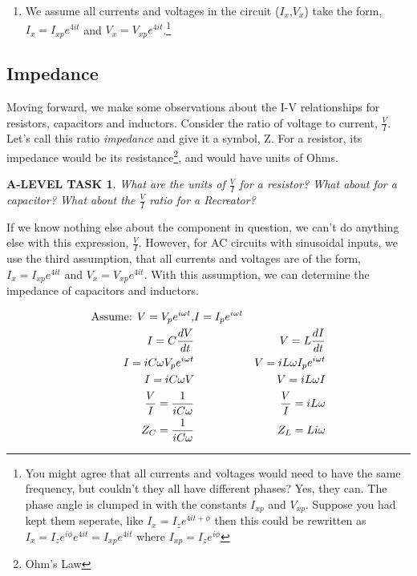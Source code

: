 \documentclass{book}
\numberwithin{equation}{section}
\newtheorem{alevel}{A-LEVEL TASK}
\theoremstyle{definition}
\begin{document}
\begin{enumerate}
\item We assume all currents and voltages in the circuit ($I_x$,$V_x$) take the form, $I_x=I_{xp}e^{4it}$ and $V_x=V_{xp}e^{4it}$.\footnote{You might agree that all currents and voltages would need to have the same frequency, but couldn't they all have different phases? Yes, they can. The phase angle is clumped in with the constants $I_{xp}$ and $V_{xp}$. Suppose you had kept them seperate, like $I_x=I_{z}e^{4it+\phi}$ then this could be rewritten as $I_x=I_{z}e^{i\phi}e^{4it}=I_{xp}e^{4it}$ where $I_{xp}=I_{z}e^{i\phi}$}
\end{enumerate}

\subsection{Impedance}
Moving forward, we make some observations about the I-V relationships for resistors, capacitors and inductors. Consider the ratio of voltage to current, $\frac{V}{I}$. Let's call this ratio \emph{impedance} and give it a symbol, Z. For a resistor, its impedance would be its resistance\footnote{Ohm's Law}, and would have units of Ohms. 

\begin{alevel}
What are the units of $\frac{V}{I}$ for a resistor? What about for a capacitor? What about the $\frac{V}{I}$ ratio for a Recreator?
\end{alevel}

If we know nothing else about the component in question, we can't do anything else with this expression, $\frac{V}{I}$. However, for AC circuits with sinusoidal inputs, we use the third assumption, that all currents and voltages are of the form, $I_x=I_{xp}e^{4it}$ and $V_x=V_{xp}e^{4it}$. With this assumption, we can determine the impedance of capacitors and inductors.

\begin{align}
\text{Assume: } V=V_pe^{i\omega t}, &I=I_pe^{i\omega t} \notag \\
I=C\frac{dV}{dt}&&V = L\frac{dI}{dt} \notag \\
I = iC\omega V_pe^{i\omega t}&&V = iL\omega I_pe^{i\omega t}\notag \\
I = iC\omega V&&V = iL\omega I \notag \\
\frac{V}{I}=\frac{1}{iC\omega}&&\frac{V}{I}=iL\omega \notag \\
Z_C=\frac{1}{iC\omega}&&Z_L = Li\omega
\end{align}
\end{document}
